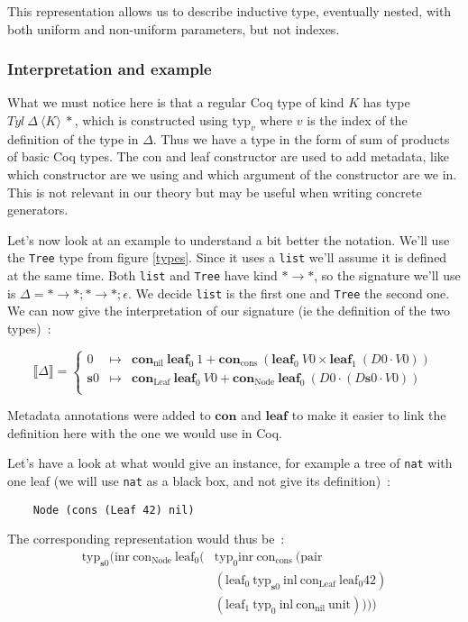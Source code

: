 \documentclass{article}
\newcommand{\lbr}{\llbracket}
\newcommand{\rbr}{\rrbracket}
\newcommand{\sem}[1]{\lbr {#1} \rbr}
\newcommand{\msig}[1]{\langle {#1} \rangle}
\newcommand{\suc}{\mathbf{s}}
\newcommand{\con}{\mathbf{con}}
\newcommand{\lf}{\mathbf{leaf}}
\begin{document}
This representation allows us to describe inductive type, eventually nested,
with both uniform and non-uniform parameters, but not indexes.

\subsubsection{Interpretation and example}

What we must notice here is that a regular Coq type of kind $K$ has type
$Tyl\ \Delta\ \msig{K}\ *$, which is constructed using $\text{typ}_v$ where
$v$ is the index of the definition of the type in $\Delta$. Thus we have a
type in the form of sum of products of basic Coq types. The con and leaf constructor
are used to add metadata, like which constructor are we using and which argument
of the constructor are we in. This is not relevant in our theory but may be
useful when writing concrete generators.

Let's now look at an example to understand a bit better the notation. We'll use
the \texttt{Tree} type from figure \ref{types}. Since it uses a \texttt{list}
we'll assume it is defined at the same time. Both \texttt{list} and \texttt{Tree}
have kind $*\rightarrow *$, so the signature we'll use is
$\Delta = *\rightarrow *; *\rightarrow *; \epsilon$. We decide \texttt{list} is the first
one and \texttt{Tree} the second one. We can now give the interpretation of our
signature (ie the definition of the two types)~:

\[\sem{\Delta} = \left\{\begin{array}{rcl}
    0 & \mapsto & \con_{\text{nil}}\ \lf_0\ 1 + \con_{\text{cons}}\ (\lf_0\ V0 \times \lf_1\ (D0\cdot V0)) \\
    \suc 0 & \mapsto & \con_{\text{Leaf}}\ \lf_0\ V0
        + \con_{\text{Node}}\ \lf_0\ (D0\cdot (D\suc 0\cdot V0)) \\
\end{array}\right.\]

Metadata annotations were added to $\con$ and $\lf$ to make it easier to link
the definition here with the one we would use in Coq.

Let's have a look at what would give an instance, for example a tree of \texttt{nat}
with one leaf (we will use \texttt{nat} as a black box, and not give its
definition)~:
\begin{verbatim}
    Node (cons (Leaf 42) nil)
\end{verbatim}

The corresponding representation would thus be~:
\begin{align*} \text{typ}_{\suc 0} (\text{inr}\ \text{con}_\text{Node}\ \text{leaf}_0
    (&\text{typ}_0 \text{inr}\ \text{con}_\text{cons}\ (\text{pair} \\
        &(\text{leaf}_0\ \text{typ}_{\suc 0}\ \text{inl}\ \text{con}_\text{Leaf}\ \text{leaf}_0 42) \\
        &(\text{leaf}_1\ \text{typ}_0\ \text{inl}\ \text{con}_\text{nil}\ \text{unit})
    ))
)
\end{align*}
\end{document}

